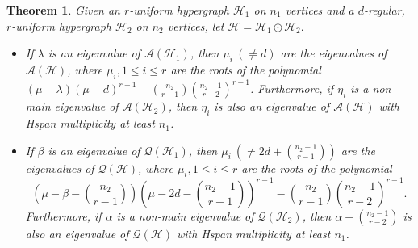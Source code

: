 \documentclass[10pt,a4paper]{article}
\newtheorem{theorem}{Theorem}[section]
\begin{document}
	
	
	\begin{theorem}
		Given an $r$-uniform hypergraph $\mathcal{H}_1$ on $n_1$ vertices and a $d$-regular, $r$-uniform hypergraph $\mathcal{H}_2$ on $n_2$ vertices, let $\mathcal{H}= \mathcal{H}_1 \odot \mathcal{H}_2. $
		\begin{itemize}
			\item If $\lambda$ is an eigenvalue of $\mathcal{A}(\mathcal{H}_1)$, then $\mu_i ~(\neq d)$ are the eigenvalues of $\mathcal{A}(\mathcal{H})$, 
			where $\mu_i, 1\leq i \leq r$ are the roots of the polynomial $(\mu -\lambda)(\mu-d)^{r-1} - \binom{n_2}{r-1}\binom{n_2-1}{r-2}^{r-1}$.
			Furthermore, if $\eta_i$ is a non-main eigenvalue of $\mathcal{A}(\mathcal{H}_2)$, then $\eta_i$ is also an eigenvalue of $\mathcal{A}(\mathcal{H})$ with Hspan multiplicity at least $n_1$.
			\item If $\beta$ is an eigenvalue of $\mathcal{Q}(\mathcal{H}_1)$, then $\mu_i ~(\neq 2d+\binom{n_2-1}{r-1})$ are the eigenvalues of $\mathcal{Q}(\mathcal{H})$, where $\mu_i, 1\leq i \leq r$ are the roots of the polynomial 
			$$\left(\mu-\beta-\binom{n_2}{r-1}\right)\left(\mu-2d-\binom{n_2-1}{r-1}\right)^{r-1}-\binom{n_2}{r-1}\binom{n_2-1}{r-2}^{r-1}.$$
			Furthermore, if $\alpha$ is a non-main eigenvalue of $\mathcal{Q}(\mathcal{H}_2)$, then $\alpha + \binom{n_2-1}{r-2}$ is also an eigenvalue of $\mathcal{Q}(\mathcal{H})$ with Hspan multiplicity at least $n_1$.
		\end{itemize}
	\end{theorem}
\end{document}
